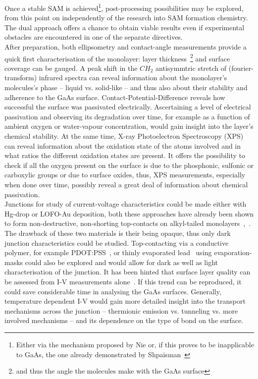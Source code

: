 \documentclass[a4paper]{article}
\begin{document}
Once a stable SAM is achieved\footnote{Either via the mechanism proposed by Nie or, if this proves to be inapplicable to GaAs, the one already demonstrated by Shpaisman~\cite{Shpaisman1}}, post-processing possibilities may be explored, from this point on independently of the research into SAM formation chemistry. The dual approach offers a chance to obtain viable results even if experimental obstacles are encountered in one of the separate directives.\\
After preparation, both ellipsometry and contact-angle measurements provide a quick first characterisation of the monolayer: layer thickness~\footnote{and thus the angle the molecules make with the GaAs surface} and surface coverage can be gauged. A peak shift in the $CH_2$ antisymmtric stretch of (fourier-transform) infrared spectra can reveal information about the monolayer's molecules's phase -- liquid vs. solid-like -- and thus also about their stability and adherence to the GaAs surface. Contact-Potential-Difference reveals how successful the surface was passivated electrically. Ascertaining a level of electrical passivation and observing its degradation over time, for example as a function of ambient oxygen or water-vapour concentration, would gain insight into the layer's chemical stability. At the same time, X-ray Photoelectron Spectroscopy (XPS) can reveal information about the oxidation state of the atoms involved and in what ratios the different oxidation states are present. It offers the possibility to check if all the oxygen present on the surface is due to the phosphonic, sulfonic or carboxylic groups or due to surface oxides, thus, XPS measurements, especially when done over time, possibly reveal a great deal of information about chemical passivation.\\
Junctions for study of current-voltage characteristics could be made either with Hg-drop or LOFO-Au deposition, both these approaches have already been shown to form non-destructive, non-shorting top-contacts on alkyl-tailed monolayers~\cite{VilanNature},~\cite{hgdrop}. The drawback of these two materials is their being opaque, thus only dark junction characteristics could be studied. Top-contacting via a conductive polymer, for example PDOT:PSS~\cite{pdot}, or thinly evaporated lead~\cite{pbevap} using evaporation-masks could also be explored and would allow for dark as well as light characterisation of the junction. It has been hinted that surface layer quality can be assessed from I-V measurements alone~\cite{Shpaisman1}. If this trend can be reproduced, it could save considerable time in analysing the GaAs surfaces. Generally, temperature dependent I-V would gain more detailed insight into the transport mechanisms across the junction -- thermionic emission vs. tunneling vs. more involved mechanisms -- and its dependence on the type of bond on the surface.\\[10pt]
\end{document}
